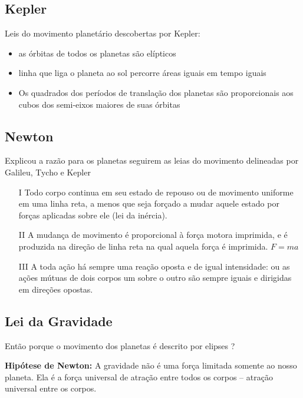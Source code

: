 \documentclass{article}
\begin{document}
\subsection{Kepler}

Leis do movimento planetário descobertas por Kepler:

\begin{itemize}
    \item as órbitas de todos os planetas são elípticos
    \item linha que liga o planeta ao sol percorre áreas iguais em 
    tempo iguais
    \item Os quadrados dos períodos de translação dos planetas 
    são proporcionais aos cubos dos semi-eixos maiores de suas órbitas
\end{itemize}

\subsection{Newton}

Explicou a razão para os planetas seguirem as leias do movimento 
delineadas por Galileu, Tycho e Kepler

\begin{itemize}
    \item [I] Todo corpo continua em seu estado de repouso ou de 
    movimento uniforme em uma linha reta, a menos que seja forçado 
    a mudar aquele estado por forças aplicadas sobre ele (lei da inércia).
    \item [II] A mudança de movimento é proporcional à força motora 
    imprimida, e é produzida na direção de linha reta na qual aquela 
    força é imprimida. $F = m a$
    \item [III] A toda ação há sempre uma reação oposta e de igual 
    intensidade: ou as ações mútuas de dois corpos um sobre o outro 
    são sempre iguais e dirigidas em direções opostas. 
\end{itemize}

\subsection{Lei da Gravidade}

Então porque o movimento dos planetas é descrito por elipses ?

\textbf{Hipótese de Newton:} A gravidade não é uma força limitada 
somente ao nosso planeta. Ela é a força universal de atração entre 
todos os corpos – atração universal entre os corpos. 
\end{document}
